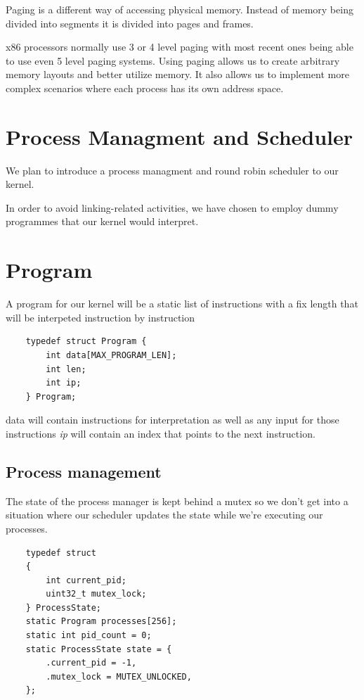 \documentclass[12pt]{report}
\begin{document}
    Paging is a different way of accessing physical memory. Instead of memory 
    being divided into segments it is divided into pages and frames. 
    
    x86 processors normally use 3 or 4 level paging with most recent ones being able
    to use even 5 level paging systems. Using paging allows us to create arbitrary
    memory layouts and better utilize memory. It also allows us to implement
    more complex scenarios where each process has its own address space.

 
	\section{Process Managment and Scheduler}
	We plan to introduce a process managment and round robin scheduler
	to our kernel.
	
	In order to avoid linking-related activities, we have chosen to employ dummy programmes that 
	our kernel would interpret.
	
	\section{Program}
	A program for our kernel will be a static list of instructions with a fix length
	that will be interpeted instruction by instruction
	
	\begin{verbatim}
	typedef struct Program {
    	int data[MAX_PROGRAM_LEN];
    	int len;
    	int ip;
	} Program;
	\end{verbatim}
	
	data will contain instructions for interpretation as well as any input for those instructions
	\textit{ip} will contain an index that points to the next instruction.
	
	\subsection{Process management}
	The state of the process manager is kept behind a mutex so we don't get into a situation
	where our scheduler updates the state while we're executing our processes.
 
	\begin{verbatim}
	typedef struct
	{
		int current_pid;
		uint32_t mutex_lock;
	} ProcessState;
	static Program processes[256];
	static int pid_count = 0;
	static ProcessState state = {
   	    .current_pid = -1,
   	    .mutex_lock = MUTEX_UNLOCKED,
	};
	\end{verbatim}
	
\end{document}
